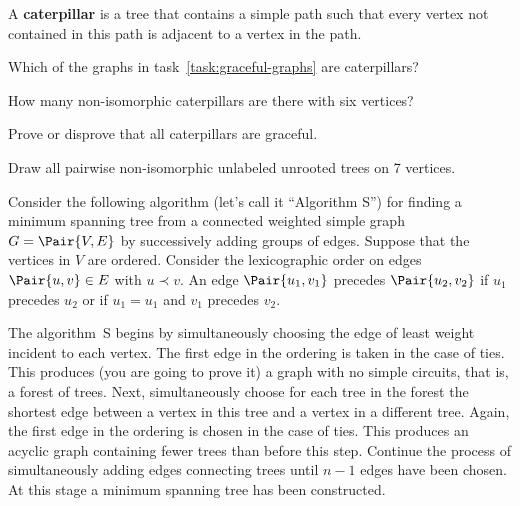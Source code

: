 \documentclass[a4paper,12pt]{article}
\begin{document}
\begin{tasks}
\begin{multicols}{2}
\begin{subtasks}
        \item {}
    \end{subtasks}
    \end{multicols}


    \item A \textbf{caterpillar} is a tree that contains a simple path such that every vertex not contained in this path is adjacent to a vertex in the path.

    \begin{subtasks}
        \item Which of the graphs in task~\ref{task:graceful-graphs} are caterpillars?
        \item How many non-isomorphic caterpillars are there with six vertices?
        \item Prove or disprove that all caterpillars are graceful.
    \end{subtasks}


    \item Draw all pairwise non-isomorphic unlabeled unrooted trees on 7 vertices.


    \item Consider the following algorithm (let's call it \enquote{Algorithm S}) for finding a minimum spanning tree from a connected weighted simple graph $G = \Pair{V, E}$ by successively adding groups of edges.
    Suppose that the vertices in $V$ are ordered.
    Consider the lexicographic order on edges $\Pair{u, v} \in E$ with $u \prec v$.
    An edge $\Pair{u_1, v_1}$ precedes $\Pair{u_2, v_2}$ if $u_1$ precedes $u_2$ or if $u_1 = u_1$ and $v_1$ precedes $v_2$.

    The algorithm~S begins by simultaneously choosing the edge of least weight incident to each vertex.
    The first edge in the ordering is taken in the case of ties.
    This produces (you are going to prove it) a graph with no simple circuits, that is, a forest of trees.
    Next, simultaneously choose for each tree in the forest the shortest edge between a vertex in this tree and a vertex in a different tree.
    Again, the first edge in the ordering is chosen in the case of ties.
    This produces an acyclic graph containing fewer trees than before this step.
    Continue the process of simultaneously adding edges connecting trees until $n - 1$ edges have been chosen.
    At this stage a minimum spanning tree has been constructed.


\end{tasks}
\end{document}
